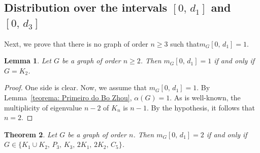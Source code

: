 \documentclass[preprint,12pt]{elsarticle}
\newtheorem{theorem}{Theorem}[section]
\newtheorem{lemma}[theorem]{Lemma}
\begin{document}
\subsection{Distribution over the intervals $[0,\,d_1]$ and $[0,\,d_3]$
} \label{subsec:32}
Next, we prove that there is no graph of order $n \geq 3$ such that\linebreak \( m_G[0,\, d_1] = 1 \).

\begin{lemma}\label{lem: k_2}
Let \( G \) be a graph of order $n \geq 2$. Then \( m_G[0,\, d_1] = 1 \) if and only if \( G = K_2 \).
\end{lemma}

\begin{proof}
One side is clear. Now, we assume that $m_G[0,\, d_1] = 1$. By Lemma~\ref{teorema: Primeiro do Bo Zhou}, $\alpha(G) = 1$. As is well-known, the multiplicity of eigenvalue \( n - 2 \) of \( K_n \) is \( n - 1 \). By the hypothesis, it follows that \( n = 2 \). 
\end{proof}




\begin{theorem} \label{thm:mg2}
Let $G$ be a graph of order $n$. Then \( m_G [0,\, d_{1}] = 2 \) if and only if $G \in \{K_1 \cup K_2,\, P_3,\, K_3,\, 2K_1,\, 2K_2,\, C_5\}$.
\end{theorem}
\end{document}
